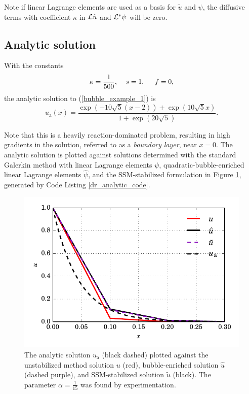 Note if linear Lagrange elements are used as a basis for $\tilde{u}$ and $\psi$, the diffusive terms with coefficient $\kappa$ in $\mathcal{L} \tilde{u}$ and $\mathcal{L}^* \psi$ will be zero.

\subsection{Analytic solution}

With the constants
\begin{align*}
  \kappa = \frac{1}{500}, \hspace{4mm} s = 1, \hspace{5mm} f = 0,
\end{align*}
the analytic solution to (\ref{bubble_example_1}) is 
$$u_{\text{a}}(x) = \frac{\exp\left(-10\sqrt{5}(x-2)\right) + \exp\left(10 \sqrt{5}x\right)}{1 + \exp\left(20\sqrt{5}\right)}.$$

Note that this is a heavily reaction-dominated problem, resulting in high gradients in the solution, referred to as a  \emph{boundary layer}, near $x=0$.  The analytic solution is plotted against solutions determined with the standard Galerkin method with linear Lagrange elements $\psi$, quadratic-bubble-enriched linear Lagrange elements $\hat{\psi}$, and the SSM-stabilized formulation in Figure \ref{dr_analytic_image}, generated by Code Listing \ref{dr_analytic_code}.


\begin{figure}
  \centering
    \includegraphics[width=\linewidth]{images/bubbles/DR_analytic_new.pdf}
  \caption[Diffusion-reaction stabilization example]{The analytic solution $u_{\text{a}}$ (black dashed) plotted against the unstabilized method solution $u$ (red), bubble-enriched solution $\hat{u}$ (dashed purple), and SSM-stabilized solution $\tilde{u}$ (black).  The parameter $\alpha = \frac{1}{15}$ was found by experimentation.}
  \label{dr_analytic_image}
\end{figure}

